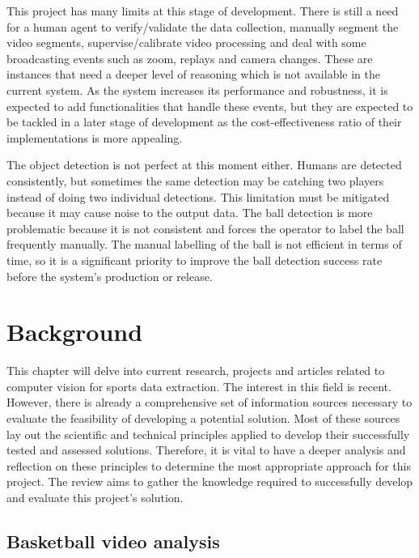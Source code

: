 \documentclass[
    11pt,
    oneside
]{report}
\begin{document}
This project has many limits at this stage of development. There is still a need for a human agent to verify/validate the data collection, manually segment the video segments, supervise/calibrate video processing and deal with some broadcasting events such as zoom, replays and camera changes. These are instances that need a deeper level of reasoning which is not available in the current system. As the system increases its performance and robustness, it is expected to add functionalities that handle these events, but they are expected to be tackled in a later stage of development as the cost-effectiveness ratio of their implementations is more appealing.


The object detection is not perfect at this moment either. Humans are detected consistently, but sometimes the same detection may be catching two players instead of doing two individual detections. This limitation must be mitigated because it may cause noise to the output data. The ball detection is more problematic because it is not consistent and forces the operator to label the ball frequently manually. The manual labelling of the ball is not efficient in terms of time, so it is a significant priority to improve the ball detection success rate before the system's production or release.





\chapter{Background}


This chapter will delve into current research, projects and articles related to computer vision for sports data extraction. The interest in this field is recent. However, there is already a comprehensive set of information sources necessary to evaluate the feasibility of developing a potential solution. Most of these sources lay out the scientific and technical principles applied to develop their successfully tested and assessed solutions. Therefore, it is vital to have a deeper analysis and reflection on these principles to determine the most appropriate approach for this project. The review aims to gather the knowledge required to successfully develop and evaluate this project's solution.


\section{Basketball video analysis}
\end{document}
